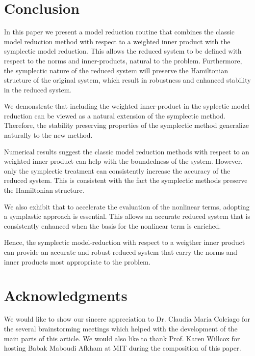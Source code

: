 \section{Conclusion} \label{sec:conc}
In this paper we present a model reduction routine that combines the classic model reduction method with respect to a weighted inner product with the symplectic model reduction. This allows the reduced system to be defined with respect to the norms and inner-products, natural to the problem. Furthermore, the symplectic nature of the reduced system will preserve the Hamiltonian structure of the original system, which result in robustness and enhanced stability in the reduced system.

We demonstrate that including the weighted inner-product in the syplectic model reduction can be viewed as a natural extension of the symplectic method. Therefore, the stability preserving properties of the symplectic method generalize naturally to the new method.

Numerical results suggest the classic model reduction methods with respect to an weighted inner product can help with the boundedness of the system. However, only the symplectic treatment can consistently increase the accuracy of the reduced system. This is consistent with the fact the symplectic methods preserve the Hamiltonian structure.

We also exhibit that to accelerate the evaluation of the nonlinear terms, adopting a symplastic approach is essential. This allows an accurate reduced system that is consistently enhanced when the basis for the nonlinear term is enriched.

Hence, the symplectic model-reduction with respect to a weigther inner product can provide an accurate and robust reduced system that carry the norms and inner products most appropriate to the problem.

\section*{Acknowledgments} We would like to show our sincere appreciation to Dr. Claudia Maria Colciago for the several brainstorming meetings which helped with the development of the main parts of this article. We would also like to thank Prof. Karen Willcox for hosting Babak Maboudi Afkham at MIT during the composition of this paper. 

